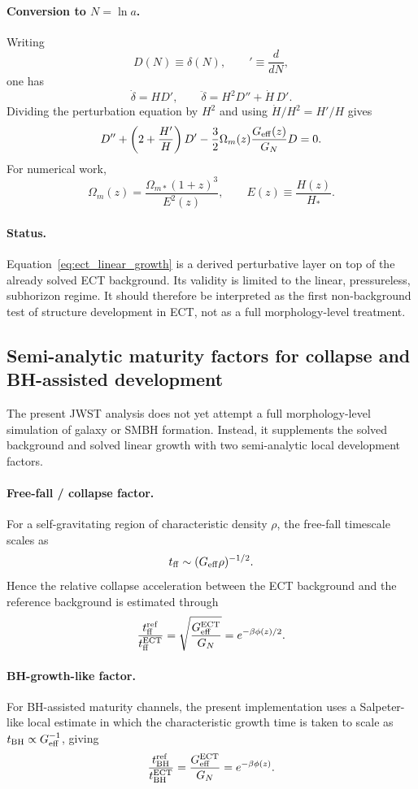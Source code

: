 \documentclass[11pt,a4paper]{article}
\numberwithin{equation}{section}
\begin{document}
\paragraph{Conversion to $N=\ln a$.}
Writing
\[
D(N)\equiv \delta(N),
\qquad
{}' \equiv \frac{d}{dN},
\]
one has
\[
\dot{\delta}=H D',
\qquad
\ddot{\delta}=H^2 D''+\dot H\,D'.
\]
Dividing the perturbation equation by $H^2$ and using
$\dot H/H^2=H'/H$ gives
\begin{equation}
D''+\left(2+\frac{H'}{H}\right)D'
-\frac{3}{2}\Omega_m(z)\frac{G_{\rm eff}(z)}{G_N}D=0.
\label{eq:ect_linear_growth}
\end{equation}
For numerical work,
\[
\Omega_m(z)=\frac{\Omega_{m*}(1+z)^3}{E^2(z)},
\qquad
E(z)\equiv \frac{H(z)}{H_*}.
\]

\paragraph{Status.}
Equation~\eqref{eq:ect_linear_growth} is a derived perturbative layer on
top of the already solved ECT background.
Its validity is limited to the linear, pressureless, subhorizon regime.
It should therefore be interpreted as the first non-background test of
structure development in ECT, not as a full morphology-level treatment.

\subsection{Semi-analytic maturity factors for collapse and BH-assisted development}
\label{sec:ect_maturity_factors}

The present JWST analysis does not yet attempt a full morphology-level
simulation of galaxy or SMBH formation.
Instead, it supplements the solved background and solved linear growth
with two semi-analytic local development factors.

\paragraph{Free-fall / collapse factor.}
For a self-gravitating region of characteristic density $\rho$, the
free-fall timescale scales as
\[
t_{\rm ff}\sim (G_{\rm eff}\rho)^{-1/2}.
\]
Hence the relative collapse acceleration between the ECT background and
the reference background is estimated through
\[
\frac{t_{\rm ff}^{\rm ref}}{t_{\rm ff}^{\rm ECT}}
=
\sqrt{\frac{G_{\rm eff}^{\rm ECT}}{G_N}}
=
e^{-\beta\phi(z)/2}.
\]

\paragraph{BH-growth-like factor.}
For BH-assisted maturity channels, the present implementation uses a
Salpeter-like local estimate in which the characteristic growth time is
taken to scale as $t_{\rm BH}\propto G_{\rm eff}^{-1}$, giving
\[
\frac{t_{\rm BH}^{\rm ref}}{t_{\rm BH}^{\rm ECT}}
=
\frac{G_{\rm eff}^{\rm ECT}}{G_N}
=
e^{-\beta\phi(z)}.
\]
\end{document}
